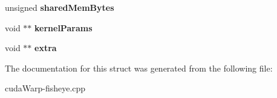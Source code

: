 \begin{DoxyCompactItemize}
\item 
unsigned {\bfseries shared\+Mem\+Bytes}\hypertarget{structCUDA__KERNEL__NODE__PARAMS__st_aa95253f0a9758936274edda8cad4a6e9}{}\label{structCUDA__KERNEL__NODE__PARAMS__st_aa95253f0a9758936274edda8cad4a6e9}

\item 
void $\ast$$\ast$ {\bfseries kernel\+Params}\hypertarget{structCUDA__KERNEL__NODE__PARAMS__st_a1632f92f673db084993121218ad12649}{}\label{structCUDA__KERNEL__NODE__PARAMS__st_a1632f92f673db084993121218ad12649}

\item 
void $\ast$$\ast$ {\bfseries extra}\hypertarget{structCUDA__KERNEL__NODE__PARAMS__st_a2faf3979f682b7ca3d834e8c010ce0f5}{}\label{structCUDA__KERNEL__NODE__PARAMS__st_a2faf3979f682b7ca3d834e8c010ce0f5}

\end{DoxyCompactItemize}


The documentation for this struct was generated from the following file\+:\begin{DoxyCompactItemize}
\item 
cuda\+Warp-\/fisheye.\+cpp\end{DoxyCompactItemize}
